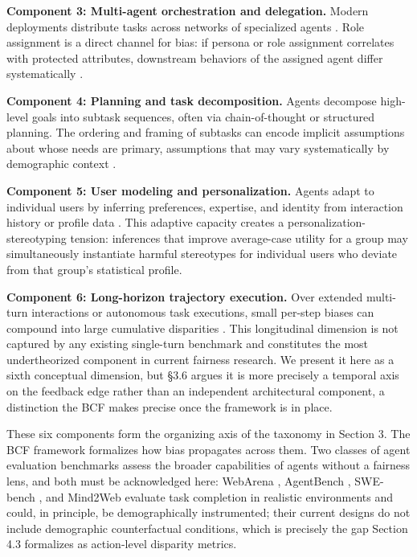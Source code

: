 \documentclass[10pt]{article}
\begin{document}
\textbf{Component 3: Multi-agent orchestration and delegation.} Modern deployments distribute tasks across networks of specialized agents \cite{wu2023autogen,park2023generative}. Role assignment is a direct channel for bias: if persona or role assignment correlates with protected attributes, downstream behaviors of the assigned agent differ systematically \cite{gupta2023bias,nguyen2025social}.

\textbf{Component 4: Planning and task decomposition.} Agents decompose high-level goals into subtask sequences, often via chain-of-thought or structured planning. The ordering and framing of subtasks can encode implicit assumptions about whose needs are primary, assumptions that may vary systematically by demographic context \cite{li2025actions,wu2025reasoning}.

\textbf{Component 5: User modeling and personalization.} Agents adapt to individual users by inferring preferences, expertise, and identity from interaction history or profile data \cite{kantharuban2024stereotype}. This adaptive capacity creates a personalization-stereotyping tension: inferences that improve average-case utility for a group may simultaneously instantiate harmful stereotypes for individual users who deviate from that group's statistical profile.

\textbf{Component 6: Long-horizon trajectory execution.} Over extended multi-turn interactions or autonomous task executions, small per-step biases can compound into large cumulative disparities \cite{ma2026implicit,wyllie2024fairness}. This longitudinal dimension is not captured by any existing single-turn benchmark and constitutes the most undertheorized component in current fairness research. We present it here as a sixth conceptual dimension, but \S{}3.6 argues it is more precisely a temporal axis on the feedback edge rather than an independent architectural component, a distinction the BCF makes precise once the framework is in place.

These six components form the organizing axis of the taxonomy in Section 3. The BCF framework formalizes how bias propagates across them. Two classes of agent evaluation benchmarks assess the broader capabilities of agents without a fairness lens, and both must be acknowledged here: WebArena \cite{zhou2024webarena}, AgentBench \cite{liu2024agentbench}, SWE-bench \cite{jimenez2024swe}, and Mind2Web \cite{deng2023mind2web} evaluate task completion in realistic environments and could, in principle, be demographically instrumented; their current designs do not include demographic counterfactual conditions, which is precisely the gap Section 4.3 formalizes as action-level disparity metrics.
\end{document}
